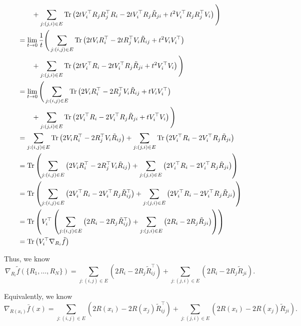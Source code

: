 \begin{align}
    &\qquad + \sum_{j:(j,i)\in E} \text{Tr} \left( 2 t V_i^\top R_j R_j^\top R_i - 2 t V_i^\top R_j \tilde{R}_{ji} + t^2 V_i^\top R_j R_j^\top V_i \right) \Bigg)
    \\
    &= \lim_{t\to0} \frac{1}{t} \Bigg( \sum_{j:(i,j)\in E} \text{Tr} \left( 2 t V_i R_i^\top - 2 t R_j^\top V_i \tilde{R}_{ij} + t^2 V_i V_i^\top \right) \\ 
    &\qquad + \sum_{j:(j,i)\in E} \text{Tr} \left( 2 t V_i^\top R_i - 2 t V_i^\top R_j \tilde{R}_{ji} + t^2 V_i^\top V_i \right) \Bigg)
    \\
    &= \lim_{t\to0} \Bigg( \sum_{j:(i,j)\in E} \text{Tr} \left( 2 V_i R_i^\top - 2 R_j^\top V_i \tilde{R}_{ij} + t V_i V_i^\top \right) \\ 
    &\qquad + \sum_{j:(j,i)\in E} \text{Tr} \left( 2 V_i^\top R_i - 2 V_i^\top R_j \tilde{R}_{ji} + t V_i^\top V_i \right) \Bigg)
    \\
    &= \sum_{j:(i,j)\in E} \text{Tr} \left( 2 V_i R_i^\top - 2 R_j^\top V_i \tilde{R}_{ij} \right) + \sum_{j:(j,i)\in E} \text{Tr} \left( 2 V_i^\top R_i - 2 V_i^\top R_j \tilde{R}_{ji} \right)
    \\
    &= \text{Tr} \left( \sum_{j:(i,j)\in E} \left( 2 V_i R_i^\top - 2 R_j^\top V_i \tilde{R}_{ij} \right) + \sum_{j:(j,i)\in E} \left( 2 V_i^\top R_i - 2 V_i^\top R_j \tilde{R}_{ji} \right) \right)
    \\
    &= \text{Tr} \left( \sum_{j:(i,j)\in E} \left( 2 V_i^\top R_i - 2 V_i^\top R_j \tilde{R}_{ij}^\top \right) + \sum_{j:(j,i)\in E} \left( 2 V_i^\top R_i - 2 V_i^\top R_j \tilde{R}_{ji} \right) \right)
    \\
    &= \text{Tr} \left(V_i^\top \left( \sum_{j:(i,j)\in E} \left( 2 R_i - 2 R_j \tilde{R}_{ij}^\top \right) + \sum_{j:(j,i)\in E} \left( 2 R_i - 2 R_j \tilde{R}_{ji} \right) \right) \right)
    \\
    &= \text{Tr}\left( V_i^\top \nabla_{R_i} \tilde{f}\right)
\end{align}

Thus, we know
\begin{equation}
    \nabla_{R_i} \tilde{f}(\{R_1,\dots,R_N\}) = \sum_{j:(i,j)\in E} \left( 2 R_i - 2 R_j \tilde{R}_{ij}^\top \right) + \sum_{j:(j,i)\in E} \left( 2 R_i - 2 R_j \tilde{R}_{ji} \right).
\end{equation}

Equivalently, we know
\begin{equation}
    \nabla_{R(x_i)} \bar{f}(x) = \sum_{j:(i,j)\in E} \left( 2 R(x_i) - 2 R(x_j) \tilde{R}_{ij}^\top \right) + \sum_{j:(j,i)\in E} \left( 2 R(x_i) - 2 R(x_j) \tilde{R}_{ji} \right).
\end{equation}

